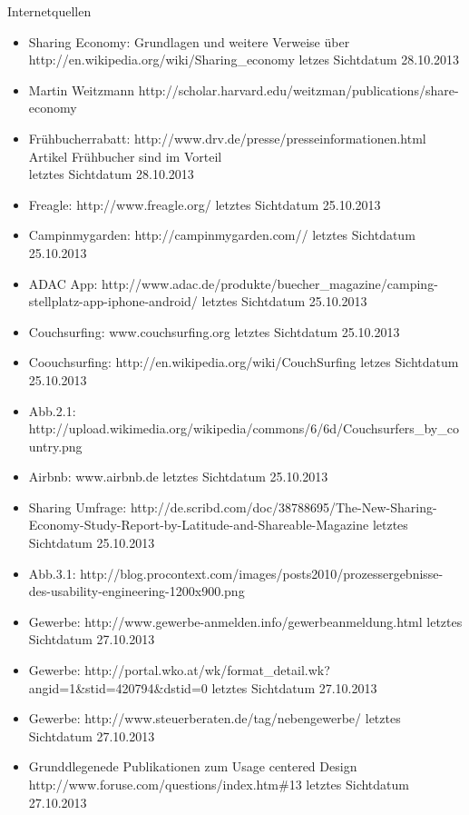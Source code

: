 Internetquellen 
\begin{itemize}
\item
Sharing Economy: Grundlagen und weitere Verweise über \\http://en.wikipedia.org/wiki/Sharing\_economy letzes Sichtdatum 28.10.2013
\item
Martin Weitzmann http://scholar.harvard.edu/weitzman/publications/share-economy
\item
Frühbucherrabatt: http://www.drv.de/presse/presseinformationen.html Artikel Frühbucher sind im Vorteil\\  letztes Sichtdatum 28.10.2013
\item
Freagle: http://www.freagle.org/ letztes Sichtdatum 25.10.2013
\item
Campinmygarden: http://campinmygarden.com// letztes Sichtdatum 25.10.2013
\item
ADAC App: http://www.adac.de/produkte/buecher\_magazine/camping-stellplatz-app-iphone-android/ letztes Sichtdatum 25.10.2013
\item
Couchsurfing: www.couchsurfing.org letztes Sichtdatum 25.10.2013
\item
Coouchsurfing: http://en.wikipedia.org/wiki/CouchSurfing letzes Sichtdatum 25.10.2013
\item
Abb.2.1: http://upload.wikimedia.org/wikipedia/commons/6/6d/Couchsurfers\_by\_country.png
\item
Airbnb: www.airbnb.de letztes Sichtdatum 25.10.2013
\item
Sharing Umfrage: http://de.scribd.com/doc/38788695/The-New-Sharing-Economy-Study-Report-by-Latitude-and-Shareable-Magazine letztes Sichtdatum 25.10.2013
\item
Abb.3.1: http://blog.procontext.com/images/posts2010/prozessergebnisse-des-usability-engineering-1200x900.png
\item
Gewerbe: http://www.gewerbe-anmelden.info/gewerbeanmeldung.html letztes Sichtdatum 27.10.2013
\item
Gewerbe: http://portal.wko.at/wk/format\_detail.wk?angid=1\&stid=420794\&dstid=0 letztes Sichtdatum 27.10.2013
\item
Gewerbe: http://www.steuerberaten.de/tag/nebengewerbe/ letztes Sichtdatum 27.10.2013
\item
Grunddlegenede Publikationen zum Usage centered Design \\http://www.foruse.com/questions/index.htm\#13 letztes Sichtdatum 27.10.2013


\end{itemize}

\newpage
